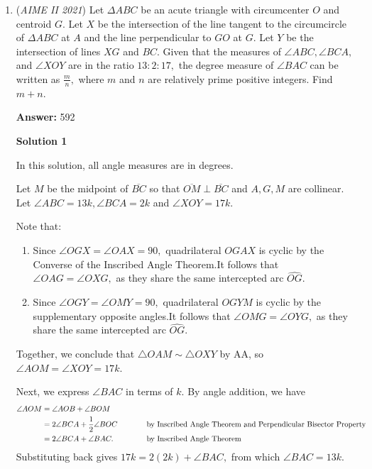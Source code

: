 \begin{enumerate}
 \href{https://mathproblemsolvingskills.wordpress.com/}{MathProblemSolvingSkills.com}

 Did not use any advanced method, easily understandable:

 


	\item (\textit{AIME II 2021}) Let $\Delta ABC$ be an acute triangle with circumcenter $O$ and centroid $G$. Let $X$ be the intersection of the line tangent to the circumcircle of $\Delta ABC$ at $A$ and the line perpendicular to $GO$ at $G$. Let $Y$ be the intersection of lines $XG$ and $BC$. Given that the measures of $\angle ABC, \angle BCA,$ and $\angle XOY$ are in the ratio $13 : 2 : 17,$ the degree measure of $\angle BAC$ can be written as $\frac{m}{n},$ where $m$ and $n$ are relatively prime positive integers. Find $m+n$.


 
 \textbf{Answer: }592



\textbf{Solution 1}

In this solution, all angle measures are in degrees.

 Let $M$ be the midpoint of $\overline{BC}$ so that $\overline{OM}\perp\overline{BC}$ and $A,G,M$ are collinear. Let $\angle ABC=13k,\angle BCA=2k$ and $\angle XOY=17k.$ 

 Note that:

 
            \begin{enumerate} 
        \item Since $\angle OGX = \angle OAX = 90,$ quadrilateral $OGAX$ is cyclic by the Converse of the Inscribed Angle Theorem.It follows that $\angle OAG = \angle OXG,$ as they share the same intercepted arc $\widehat{OG}.$


        \item Since $\angle OGY = \angle OMY = 90,$ quadrilateral $OGYM$ is cyclic by the supplementary opposite angles.It follows that $\angle OMG = \angle OYG,$ as they share the same intercepted arc $\widehat{OG}.$


            \end{enumerate}
            Together, we conclude that $\triangle OAM \sim \triangle OXY$ by AA, so $\angle AOM = \angle XOY = 17k.$

 Next, we express $\angle BAC$ in terms of $k.$ By angle addition, we have
 \begin{align*} \angle AOM &= \angle AOB + \angle BOM \\ &= 2\angle BCA + \frac12\angle BOC \hspace{10mm} &&\text{by Inscribed Angle Theorem and Perpendicular Bisector Property} \\ &= 2\angle BCA + \angle BAC. &&\text{by Inscribed Angle Theorem} \end{align*}
Substituting back gives $17k=2(2k)+\angle BAC,$ from which $\angle BAC=13k.$


\end{enumerate}
